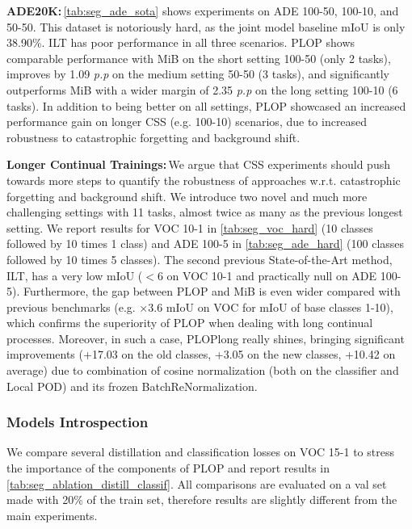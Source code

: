 \noindent\textbf{ADE20K:\,}\autoref{tab:seg_ade_sota} shows experiments on ADE 100-50, 100-10, and
50-50. This dataset is notoriously hard, as the joint model baseline \ac{mIoU} is only 38.90\%. ILT
has poor performance in all three scenarios. PLOP shows comparable performance with MiB on the short
setting 100-50 (only 2 tasks), improves by 1.09 \textit{p.p} on the medium setting 50-50 (3 tasks),
and significantly outperforms MiB with a wider margin of 2.35 \textit{p.p} on the long setting
100-10 (6 tasks). In addition to being better on all settings, PLOP showcased an increased
performance gain on longer \ac{CSS} (e.g. 100-10) scenarios, due to increased robustness to catastrophic
forgetting and background shift.


\noindent\textbf{Longer Continual Trainings:\,}We argue that \ac{CSS} experiments should push towards
more steps
\cite{wortsman2020supermasks,lomonaco2020ar1,douillard2020podnet,castro2018end_to_end_inc_learn} to
quantify the robustness of approaches w.r.t. catastrophic forgetting and background shift. We
introduce two novel and much more challenging settings with 11 tasks, almost twice as many as the
previous longest setting. We report results for VOC 10-1 in \autoref{tab:seg_voc_hard} (10 classes
followed by 10 times 1 class) and ADE 100-5 in \autoref{tab:seg_ade_hard} (100 classes followed by
10 times 5 classes). The second previous State-of-the-Art method, ILT, has a very low \ac{mIoU}
($<6$ on VOC 10-1 and practically null on ADE 100-5). Furthermore, the gap between PLOP and MiB is
even wider compared with previous benchmarks (e.g. $\times$3.6 \ac{mIoU} on VOC for \ac{mIoU} of
base classes 1-10), which confirms the superiority of PLOP when dealing with long continual
processes. Moreover, in such a case, PLOPlong really shines, bringing significant improvements
(+17.03 \pp on the old classes, +3.05 \pp on the new classes, +10.42 \pp on average) due to
combination of cosine normalization (both on the classifier and Local POD) and its frozen
BatchReNormalization.

\subsubsection{Models Introspection}

We compare several distillation and classification losses on VOC 15-1 to stress the importance of
the components of PLOP and report results in \autoref{tab:seg_ablation_distill_classif}. All
comparisons are evaluated on a val set made with 20\% of the train set, therefore results are
slightly different from the main experiments.


